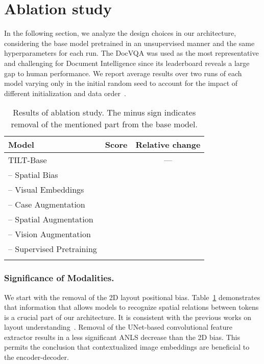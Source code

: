 \documentclass[runningheads]{llncs}
\begin{document}
\section{Ablation study}
In the following section, we analyze the design choices in our architecture, considering the base model pretrained in an unsupervised manner and the same hyperparameters for each run.
The DocVQA was used as the most representative and challenging for Document Intelligence since its leaderboard reveals a large gap to human performance.
We report average results over two runs of each model varying only in the initial random seed to account for the impact of different initialization and data order~\cite{dodge2020finetuning}. 



\begin{table}[t]
    \caption{Results of ablation study. The minus sign indicates removal of the mentioned part from the base model. \label{tab:ablation}}
    \setlength{\tabcolsep}{7pt}
    \centering
    \begin{tabular}{lcc}
        \toprule
        Model &
        Score &
        Relative change\\

        \midrule
        TILT-Base &  & ---  \\
        \quad -- Spatial Bias &  & \\
        \quad -- Visual Embeddings&  & \\
        \quad -- Case Augmentation &  & \\
        \quad -- Spatial Augmentation &  & \\
        \quad -- Vision Augmentation &  & \\
        \quad -- Supervised Pretraining &  & \\
        \bottomrule  \\
    \end{tabular}
\end{table}


\subsubsection{Significance of Modalities.} We start with the removal of the 2D layout positional bias. Table~\ref{tab:ablation} demonstrates that information that allows models to recognize spatial relations between tokens is a crucial part of our architecture. It is consistent with the previous works on layout understanding~\cite{xu2020layoutlmv2,garncarek2020lambert}. 
Removal of the UNet-based convolutional feature extractor results in a less significant ANLS decrease than the 2D bias. This permits the conclusion that contextualized image embeddings are beneficial to the encoder-decoder.
\end{document}
